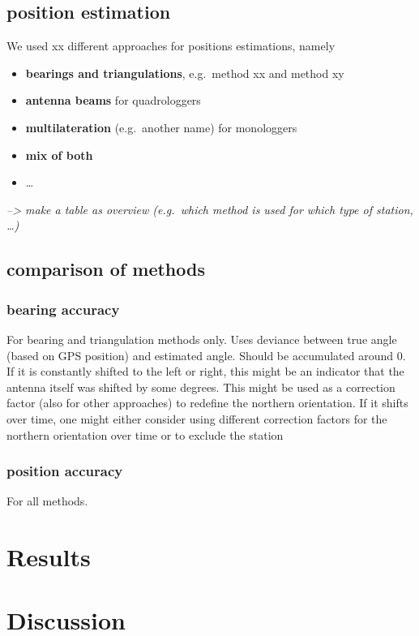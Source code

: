 \documentclass[
]{article}
\providecommand{\tightlist}{%
  \setlength{\itemsep}{0pt}\setlength{\parskip}{0pt}}\usepackage{longtable,booktabs,array}
\begin{document}
\subsection{position estimation}\label{position-estimation}

We used xx different approaches for positions estimations, namely

\begin{itemize}
\tightlist
\item
  \textbf{bearings and triangulations}, e.g.~method xx and method xy\\
\item
  \textbf{antenna beams} for quadrologgers\\
\item
  \textbf{multilateration} (e.g.~another name) for monologgers\\
\item
  \textbf{mix of both}\\
\item
  \ldots{}
\end{itemize}

\emph{--\textgreater{} make a table as overview (e.g.~which method is
used for which type of station, \ldots)}

\subsection{comparison of methods}\label{comparison-of-methods}

\subsubsection{bearing accuracy}\label{bearing-accuracy}

For bearing and triangulation methods only. Uses deviance between true
angle (based on GPS position) and estimated angle. Should be accumulated
around 0. If it is constantly shifted to the left or right, this might
be an indicator that the antenna itself was shifted by some degrees.
This might be used as a correction factor (also for other approaches) to
redefine the northern orientation. If it shifts over time, one might
either consider using different correction factors for the northern
orientation over time or to exclude the station

\subsubsection{position accuracy}\label{position-accuracy}

For all methods.

\section{Results}\label{results}

\section{Discussion}\label{discussion}


\printbibliography[title=References]
\end{document}
